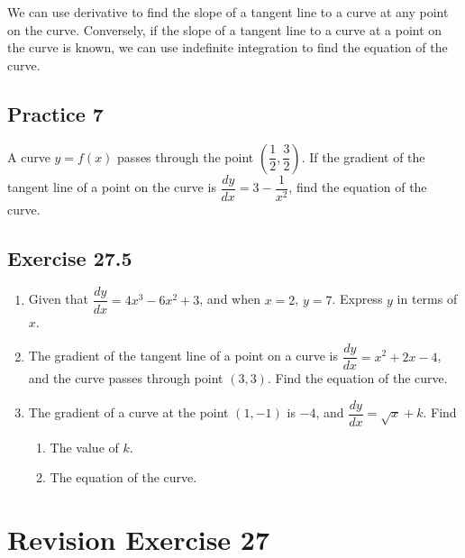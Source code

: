 \documentclass{report}
\begin{document}
We can use derivative to find the slope of a tangent line to a curve at any
point on the curve. Conversely, if the slope of a tangent line to a curve at a
point on the curve is known, we can use indefinite integration to find the
equation of the curve.

\subsection{Practice 7}
A curve $y = f(x)$ passes through the point $\left(\dfrac{1}{2},
    \dfrac{3}{2}\right)$. If the gradient of the tangent line of a point on the
curve is $\dfrac{dy}{dx} = 3 - \dfrac{1}{x^2}$, find the equation of the curve.

\subsection{Exercise 27.5}

\begin{enumerate}
    \item Given that $\dfrac{dy}{dx} = 4x^3 - 6x^2 + 3$, and when $x = 2$, $y = 7$.
          Express $y$ in terms of $x$.
    \item The gradient of the tangent line of a point on a curve is $\dfrac{dy}{dx} = x^2
              + 2x - 4$, and the curve passes through point $(3, 3)$. Find the equation of
          the curve.
    \item The gradient of a curve at the point $(1, -1)$ is $-4$, and $\dfrac{dy}{dx} =
              \sqrt{x} + k$. Find
          \begin{enumerate}
              \item The value of $k$.
              \item The equation of the curve.
          \end{enumerate}
\end{enumerate}

\newpage
\section*{Revision Exercise 27}
\end{document}
